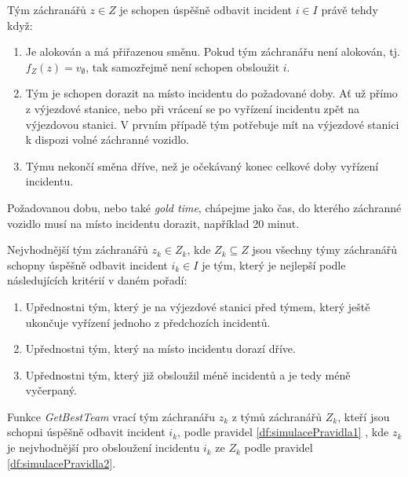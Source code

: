 \begin{definice}\label{df:simulacePravidla1}
  Tým záchranářů $z \in Z$ je schopen úspěšně odbavit incident $i \in I$ právě tehdy když:

  \begin{enumerate}
    \item
      Je alokován a má přiřazenou směnu. Pokud tým záchranářu není alokován, tj. $f_Z(z) = v_{\emptyset}$, tak samozřejmě není schopen obsloužit $i$.

    \item
      Tým je schopen dorazit na místo incidentu do požadované doby.
      Ať už přímo z výjezdové stanice, nebo při vrácení se po vyřízení incidentu zpět na výjezdovou stanici. 
      V prvním případě tým potřebuje mít na výjezdové stanici k dispozi volné záchranné vozidlo.

    \item
      Týmu nekončí směna dříve, než je očekávaný konec celkové doby vyřízení incidentu.
  \end{enumerate}
\end{definice}
Požadovanou dobu, nebo také \textit{gold time}, chápejme jako čas, do kterého záchranné vozidlo musí na místo incidentu dorazit, například 20 minut.

\begin{definice}\label{df:simulacePravidla2}
  Nejvhodnější tým záchranářů $z_k \in Z_k$, kde $Z_k \subseteq Z$ jsou všechny týmy záchranářů schopny úspěšně odbavit incident $i_k \in I$ je tým,
  který je nejlepší podle následujících kritérií v daném pořadí:

  \begin{enumerate}
    \item Upřednostni tým, který je na výjezdové stanici před týmem, který ještě ukončuje vyřízení jednoho z předchozích incidentů. 
    \item Upřednostni tým, který na místo incidentu dorazí dříve. 
    \item Upřednostni tým, který již obsloužil méně incidentů a je tedy méně vyčerpaný.
  \end{enumerate}
\end{definice}

\begin{definice}[GetBestTeam]\label{df:getBestTeam}
Funkce \textit{GetBestTeam} vrací tým záchranářu $z_k$ z týmů záchranářů $Z_k$, kteří jsou schopni úspěšně odbavit incident $i_k$, podle pravidel \ref{df:simulacePravidla1}
, kde $z_k$ je nejvhodnější pro obsloužení incidentu $i_k$ ze $Z_k$ podle pravidel \ref{df:simulacePravidla2}. 
\end{definice}

